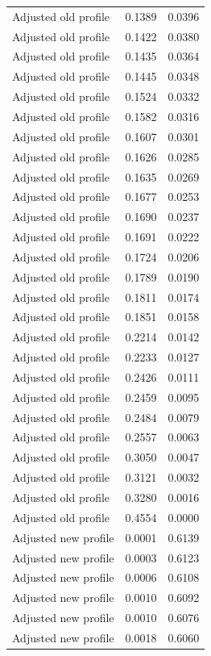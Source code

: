 \begin{table}[htbp]
\begin{tabular}{lll}
Adjusted old profile & 0.1389 & 0.0396 \\
Adjusted old profile & 0.1422 & 0.0380 \\
Adjusted old profile & 0.1435 & 0.0364 \\
Adjusted old profile & 0.1445 & 0.0348 \\
Adjusted old profile & 0.1524 & 0.0332 \\
Adjusted old profile & 0.1582 & 0.0316 \\
Adjusted old profile & 0.1607 & 0.0301 \\
Adjusted old profile & 0.1626 & 0.0285 \\
Adjusted old profile & 0.1635 & 0.0269 \\
Adjusted old profile & 0.1677 & 0.0253 \\
Adjusted old profile & 0.1690 & 0.0237 \\
Adjusted old profile & 0.1691 & 0.0222 \\
Adjusted old profile & 0.1724 & 0.0206 \\
Adjusted old profile & 0.1789 & 0.0190 \\
Adjusted old profile & 0.1811 & 0.0174 \\
Adjusted old profile & 0.1851 & 0.0158 \\
Adjusted old profile & 0.2214 & 0.0142 \\
Adjusted old profile & 0.2233 & 0.0127 \\
Adjusted old profile & 0.2426 & 0.0111 \\
Adjusted old profile & 0.2459 & 0.0095 \\
Adjusted old profile & 0.2484 & 0.0079 \\
Adjusted old profile & 0.2557 & 0.0063 \\
Adjusted old profile & 0.3050 & 0.0047 \\
Adjusted old profile & 0.3121 & 0.0032 \\
Adjusted old profile & 0.3280 & 0.0016 \\
Adjusted old profile & 0.4554 & 0.0000 \\
Adjusted new profile & 0.0001 & 0.6139 \\
Adjusted new profile & 0.0003 & 0.6123 \\
Adjusted new profile & 0.0006 & 0.6108 \\
Adjusted new profile & 0.0010 & 0.6092 \\
Adjusted new profile & 0.0010 & 0.6076 \\
Adjusted new profile & 0.0018 & 0.6060 \\

\end{tabular}
\end{table}
